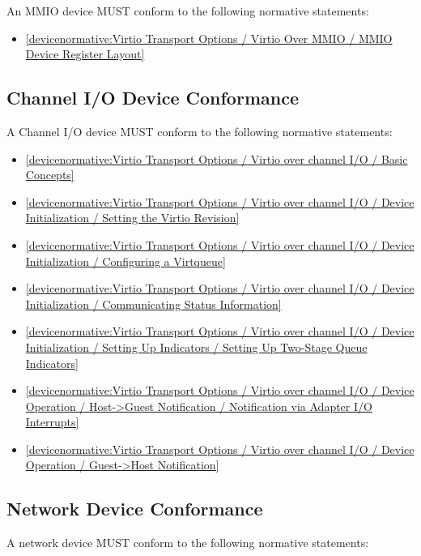 An MMIO device MUST conform to the following normative statements:

\begin{itemize}
\item \ref{devicenormative:Virtio Transport Options / Virtio Over MMIO / MMIO Device Register Layout}
\end{itemize}

\subsection{Channel I/O Device Conformance}\label{sec:Conformance / Device Conformance / Channel I/O Device Conformance}

A Channel I/O device MUST conform to the following normative statements:

\begin{itemize}
\item \ref{devicenormative:Virtio Transport Options / Virtio over channel I/O / Basic Concepts}
\item \ref{devicenormative:Virtio Transport Options / Virtio over channel I/O / Device Initialization / Setting the Virtio Revision}
\item \ref{devicenormative:Virtio Transport Options / Virtio over channel I/O / Device Initialization / Configuring a Virtqueue}
\item \ref{devicenormative:Virtio Transport Options / Virtio over channel I/O / Device Initialization / Communicating Status Information}
\item \ref{devicenormative:Virtio Transport Options / Virtio over channel I/O / Device Initialization / Setting Up Indicators / Setting Up Two-Stage Queue Indicators}
\item \ref{devicenormative:Virtio Transport Options / Virtio over channel I/O / Device Operation / Host->Guest Notification / Notification via Adapter I/O Interrupts}
\item \ref{devicenormative:Virtio Transport Options / Virtio over channel I/O / Device Operation / Guest->Host Notification}
\end{itemize}

\subsection{Network Device Conformance}\label{sec:Conformance / Device Conformance / Network Device Conformance}

A network device MUST conform to the following normative statements:


